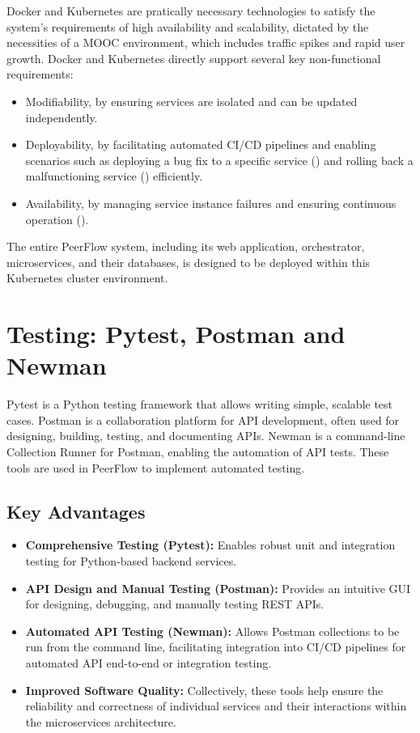\begin{justify}
Docker and Kubernetes are pratically necessary technologies to satisfy the system's requirements of high availability and scalability, dictated by the necessities of a MOOC environment, which includes traffic spikes and rapid user growth. Docker and Kubernetes directly support several key non-functional requirements: 
\begin{itemize}
    \item Modifiability, by ensuring services are isolated and can be updated independently.
    \item Deployability, by facilitating automated CI/CD pipelines and enabling scenarios such as deploying a bug fix to a specific service () and rolling back a malfunctioning service () efficiently.
    \item Availability, by managing service instance failures and ensuring continuous operation ().
\end{itemize}
The entire PeerFlow system, including its web application, orchestrator, microservices, and their databases, is designed to be deployed within this Kubernetes cluster environment.
\end{justify}

\section{Testing: Pytest, Postman and Newman}

\begin{justify}
Pytest is a Python testing framework that allows writing simple, scalable test cases. Postman is a collaboration platform for API development, often used for designing, building, testing, and documenting APIs. Newman is a command-line Collection Runner for Postman, enabling the automation of API tests. These tools are used in PeerFlow to implement automated testing.
\end{justify}

\subsection{Key Advantages}

\begin{itemize}
\item \textbf{Comprehensive Testing (Pytest):} Enables robust unit and integration testing for Python-based backend services.
\item \textbf{API Design and Manual Testing (Postman):} Provides an intuitive GUI for designing, debugging, and manually testing REST APIs.
\item \textbf{Automated API Testing (Newman):} Allows Postman collections to be run from the command line, facilitating integration into CI/CD pipelines for automated API end-to-end or integration testing.
\item \textbf{Improved Software Quality:} Collectively, these tools help ensure the reliability and correctness of individual services and their interactions within the microservices architecture.
\end{itemize}

